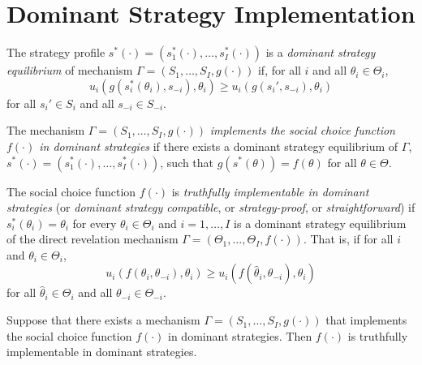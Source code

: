 \section{Dominant Strategy Implementation}

\begin{defn}
    The strategy profile $s^*(\cdot) = (s_1^*(\cdot), \dots, s_I^*(\cdot))$ is a \emph{dominant strategy equilibrium} of mechanism $\Gamma = (S_1, \dots, S_I, g(\cdot))$ if, for all $i$ and all $\theta_i \in \Theta_i$, 
    \begin{equation*}
        u_i\left(g\left( s_i^* (\theta_i), s_{-i}\right), \theta_i\right) \geq u_i\left(g\left(s_i', s_{-i}\right), \theta_i\right)
    \end{equation*}
    for all $s_i' \in S_i$ and all $s_{-i} \in S_{-i}$.
\end{defn}

\begin{defn}
    The mechanism $\Gamma = (S_1, \dots, S_I, g(\cdot))$ \emph{implements the social choice function $f(\cdot)$ in dominant strategies} if there exists a dominant strategy equilibrium of $\Gamma$, $s^*(\cdot) = (s_1^*(\cdot), \dots, s_I^*(\cdot))$, such that $g(s^*(\theta)) = f(\theta)$ for all $\theta \in \Theta$.
\end{defn}

\begin{defn}
    The social choice function $f(\cdot)$ is \emph{truthfully implementable in dominant strategies} (or \emph{dominant strategy compatible}, or \emph{strategy-proof}, or \emph{straightforward}) if $s_i^*(\theta_i) = \theta_i$ for every $\theta_i \in \Theta_i$ and $i = 1, \dots, I$ is a dominant strategy equilibrium of the direct revelation mechanism $\Gamma = (\Theta_1, \dots, \Theta_I, f(\cdot))$. That is, if for all $i$ and $\theta_i \in \Theta_i$,
    \begin{equation*}
        u_i(f(\theta_i, \theta_{-i}), \theta_i) \geq u_i(f(\hat{\theta}_i, \theta_{-i}), \theta_i)
    \end{equation*}
    for all $\hat{\theta}_i \in \Theta_i$ and all $\theta_{-i} \in \Theta_{-i}$.
\end{defn}

\begin{prop}
    Suppose that there exists a mechanism $\Gamma = (S_1, \dots, S_I, g(\cdot))$ that implements the social choice function $f(\cdot)$ in dominant strategies. Then $f(\cdot)$ is truthfully implementable in dominant strategies.
\end{prop}

